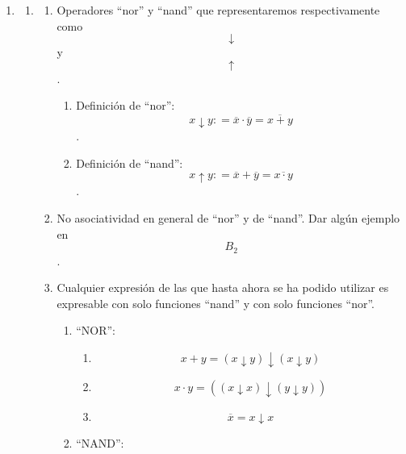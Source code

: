 \begin{enumerate}
\def\labelenumi{\arabic{enumi}.}
\item
  \begin{enumerate}
  \def\labelenumii{\arabic{enumii}.}
  \item
    \begin{enumerate}
    \def\labelenumiii{\arabic{enumiii}.}
    \item
      Operadores ``nor'' y ``nand'' que representaremos respectivamente
      como \[\downarrow\]y \[\uparrow\].

      \begin{enumerate}
      \def\labelenumiv{\arabic{enumiv}.}
      \tightlist
      \item
        Definición de ``nor'':
        \[{x\downarrow y}{: =}{{\overline{x} \cdot \overline{y}} = \overline{x+y}}\].
      \item
        Definición de ``nand'':
        \[{x\uparrow y}{: =}{{\overline{x} + \overline{y}} = \overline{x\cdot y}}\].
      \end{enumerate}
    \item
      No asociatividad en general de ``nor'' y de ``nand''. Dar algún
      ejemplo en \[B_{2}\].
    \item
      Cualquier expresión de las que hasta ahora se ha podido utilizar
      es expresable con solo funciones ``nand'' y con solo funciones
      ``nor''.

      \begin{enumerate}
      \def\labelenumiv{\arabic{enumiv}.}
      \item
        ``NOR'':

        \begin{enumerate}
        \def\labelenumv{\arabic{enumv}.}
        \tightlist
        \item
          \[{{x + y} = {({x\downarrow y})}}\downarrow{({x\downarrow y})}\]
        \item
          \[{x \cdot y} = {({{({x\downarrow x})}}\downarrow{({y\downarrow y})})}\]
        \item
          \[\overline{x} = {x\downarrow x}\]
        \end{enumerate}
      \item
        ``NAND'':


\end{enumerate}
\end{enumerate}
\end{enumerate}
\end{enumerate}
